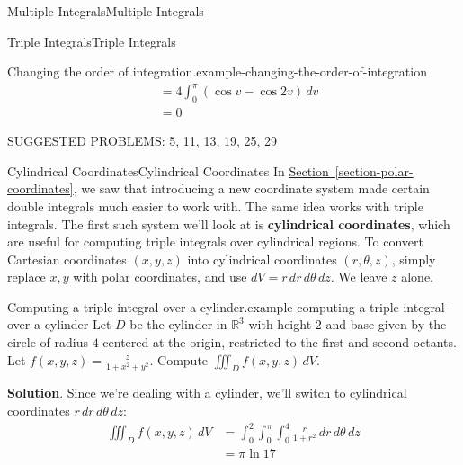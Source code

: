\documentclass[10pt,]{book}
\newcommand{\terminology}[1]{\textbf{#1}}
\numberwithin{equation}{section}
\newcommand{\RR}{\mathbb{R}}
\begin{document}
\begin{chapterptx}{Multiple Integrals}{}{Multiple Integrals}{}{}
\begin{sectionptx}{Triple Integrals}{}{Triple Integrals}{}{}
\begin{example}{Changing the order of integration.}{example-changing-the-order-of-integration}
\begin{align*}
& = 4\int_{0}^{\pi} (\cos v - \cos2v)\,dv \\
& = 0 
\end{align*}
%
\end{example}
\hypertarget{p-1302}{}%
SUGGESTED PROBLEMS: 5, 11, 13, 19, 25, 29%
\end{sectionptx}
%
%
\typeout{************************************************}
\typeout{************************************************}
%
\begin{sectionptx}{Cylindrical Coordinates}{}{Cylindrical Coordinates}{}{}\label{section-cylindrical-coordinates}
\hypertarget{p-1303}{}%
In \hyperref[section-polar-coordinates]{Section~\ref{section-polar-coordinates}}, we saw that introducing a new coordinate system made certain double integrals much easier to work with. The same idea works with triple integrals. The first such system we'll look at is \terminology{cylindrical coordinates}, which are useful for computing triple integrals over cylindrical regions. To convert Cartesian coordinates \((x,y,z)\) into cylindrical coordinates \((r,\theta,z)\), simply replace \(x,y\) with polar coordinates, and use \(dV = r\,dr\,d\theta\,dz\). We leave \(z\) alone.%
\begin{example}{Computing a triple integral over a cylinder.}{example-computing-a-triple-integral-over-a-cylinder}%
\hypertarget{p-1304}{}%
Let \(D\) be the cylinder in \(\RR^{3}\) with height \(2\) and base given by the circle of radius \(4\) centered at the origin, restricted to the first and second octants. Let \(f(x,y,z) = \frac{z}{1+x^{2}+y^{2}}\). Compute \(\iiint_{D}f(x,y,z)\,dV\).%
\par\smallskip%
\noindent\textbf{Solution}.\hypertarget{solution-210}{}\quad%
\hypertarget{p-1305}{}%
Since we're dealing with a cylinder, we'll switch to cylindrical coordinates \(r\,dr\,d\theta\,dz\):%
\begin{align*}
\iiint_{D}f(x,y,z)\,dV & = \int_{0}^{2}\int_{0}^{\pi}\int_{0}^{4}\frac{r}{1+r^{2}}\,dr\,d\theta\,dz \\
& = \pi\ln17 
\end{align*}
%
\end{example}
\end{sectionptx}
\end{chapterptx}
%
%
%
%
\typeout{************************************************}
\end{document}
